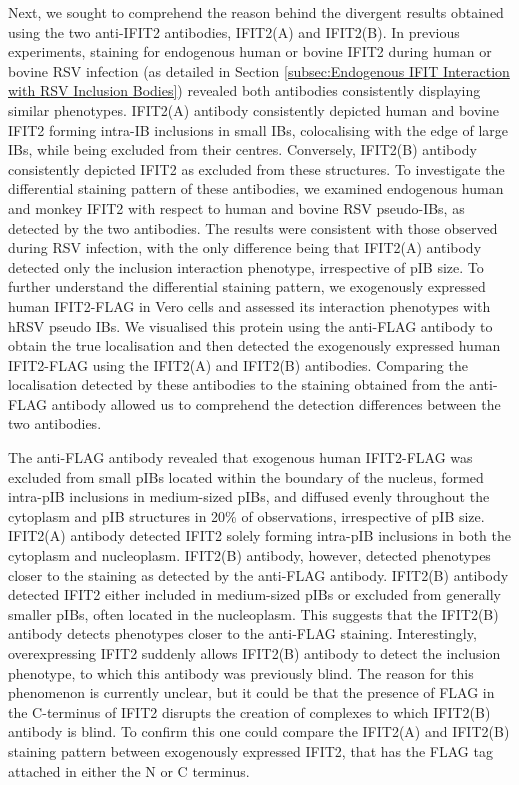 Next, we sought to comprehend the reason behind the divergent results obtained using the two anti-IFIT2 antibodies, IFIT2(A) and IFIT2(B). In previous experiments, staining for endogenous human or bovine IFIT2 during human or bovine RSV infection (as detailed in Section \ref{subsec:Endogenous IFIT Interaction with RSV Inclusion Bodies}) revealed both antibodies consistently displaying similar phenotypes. IFIT2(A) antibody consistently depicted human and bovine IFIT2 forming intra-IB inclusions in small IBs, colocalising with the edge of large IBs, while being excluded from their centres. Conversely, IFIT2(B) antibody consistently depicted IFIT2 as excluded from these structures. To investigate the differential staining pattern of these antibodies, we examined endogenous human and monkey IFIT2 with respect to human and bovine RSV pseudo-IBs, as detected by the two antibodies. The results were consistent with those observed during RSV infection, with the only difference being that IFIT2(A) antibody detected only the inclusion interaction phenotype, irrespective of pIB size. To further understand the differential staining pattern, we exogenously expressed human IFIT2-FLAG in Vero cells and assessed its interaction phenotypes with hRSV pseudo IBs. We visualised this protein using the anti-FLAG antibody to obtain the true localisation and then detected the exogenously expressed human IFIT2-FLAG using the IFIT2(A) and IFIT2(B) antibodies. Comparing the localisation detected by these antibodies to the staining obtained from the anti-FLAG antibody allowed us to comprehend the detection differences between the two antibodies.

The anti-FLAG antibody revealed that exogenous human IFIT2-FLAG was excluded from small pIBs located within the boundary of the nucleus, formed intra-pIB inclusions in medium-sized pIBs, and diffused evenly throughout the cytoplasm and pIB structures in 20\% of observations, irrespective of pIB size. IFIT2(A) antibody detected IFIT2 solely forming intra-pIB inclusions in both the cytoplasm and nucleoplasm. IFIT2(B) antibody, however, detected phenotypes closer to the staining as detected by the anti-FLAG antibody. IFIT2(B) antibody detected IFIT2 either included in medium-sized pIBs or excluded from generally smaller pIBs, often located in the nucleoplasm. This suggests that the IFIT2(B) antibody detects phenotypes closer to the anti-FLAG staining. Interestingly, overexpressing IFIT2 suddenly allows IFIT2(B) antibody to detect the inclusion phenotype, to which this antibody was previously blind. The reason for this phenomenon is currently unclear, but it could be that the presence of FLAG in the C-terminus of IFIT2 disrupts the creation of complexes to which IFIT2(B) antibody is blind. To confirm this one could compare the IFIT2(A) and IFIT2(B) staining pattern between exogenously expressed IFIT2, that has the FLAG tag attached in either the N or C terminus.

